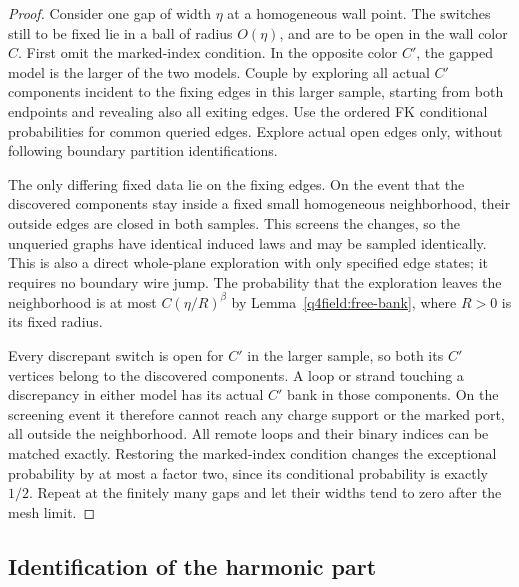 \begin{proof}
Consider one gap of width $\eta$ at a homogeneous wall point.  The
switches still to be fixed lie in a ball of radius $O(\eta)$, and are
to be open in the wall color $C$.  First omit the marked-index
condition.  In the opposite color $C'$, the gapped model is the
larger of the two models.  Couple by exploring all actual $C'$
components incident to the fixing edges in this larger sample,
starting from both endpoints and revealing also all exiting edges.
Use the ordered FK conditional probabilities for common queried
edges.  Explore actual open edges only, without following boundary
partition identifications.

The only differing fixed data lie on the fixing edges.  On the event
that the discovered components stay inside a fixed small homogeneous
neighborhood, their outside edges are closed in both samples.  This
screens the changes, so the unqueried graphs have identical induced
laws and may be sampled identically.  This is also a direct
whole-plane exploration with only specified edge states; it requires
no boundary wire jump.  The probability that the exploration leaves
the neighborhood is at most $C(\eta/R)^\beta$ by
Lemma~\ref{q4field:free-bank}, where $R>0$ is its fixed radius.

Every discrepant switch is open for $C'$ in the larger sample, so
both its $C'$ vertices belong to the discovered components.  A loop
or strand touching a discrepancy in either model has its actual
$C'$ bank in those components.  On the screening event it therefore
cannot reach any charge support or the marked port, all outside the
neighborhood.  All remote loops and their binary indices can be
matched exactly.  Restoring the marked-index condition changes the
exceptional probability by at most a factor two, since its
conditional probability is exactly $1/2$.  Repeat at the finitely
many gaps and let their widths tend to zero after the mesh limit.
\end{proof}

\subsection{Identification of the harmonic part}

